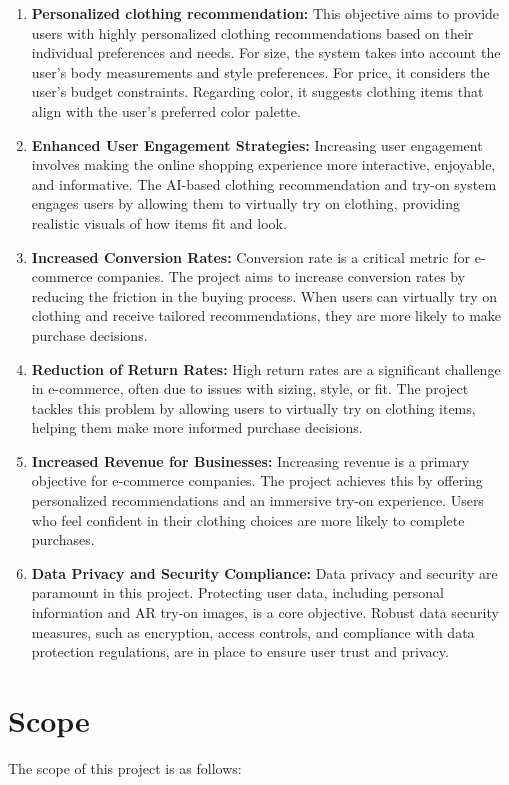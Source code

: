 	\begin{enumerate}
        \item \textbf{Personalized clothing recommendation:} This objective aims to provide users with highly personalized clothing recommendations based on their individual preferences and needs. For size, the system takes into account the user's body measurements and style preferences. For price, it considers the user's budget constraints. Regarding color, it suggests clothing items that align with the user's preferred color palette.
        \item \textbf{Enhanced User Engagement Strategies:} Increasing user engagement involves making the online shopping experience more interactive, enjoyable, and informative. The AI-based clothing recommendation and try-on system engages users by allowing them to virtually try on clothing, providing realistic visuals of how items fit and look.
        \item \textbf{Increased Conversion Rates:} Conversion rate is a critical metric for e-commerce companies. The project aims to increase conversion rates by reducing the friction in the buying process. When users can virtually try on clothing and receive tailored recommendations, they are more likely to make purchase decisions.
        \item \textbf{Reduction of Return Rates:} High return rates are a significant challenge in e-commerce, often due to issues with sizing, style, or fit. The project tackles this problem by allowing users to virtually try on clothing items, helping them make more informed purchase decisions.
        \item \textbf{Increased Revenue for Businesses:} Increasing revenue is a primary objective for e-commerce companies. The project achieves this by offering personalized recommendations and an immersive try-on experience. Users who feel confident in their clothing choices are more likely to complete purchases.
        \item \textbf{Data Privacy and Security Compliance:} Data privacy and security are paramount in this project. Protecting user data, including personal information and AR try-on images, is a core objective. Robust data security measures, such as encryption, access controls, and compliance with data protection regulations, are in place to ensure user trust and privacy.
	\end{enumerate}

\section{Scope}
	The scope of this project is as follows:

